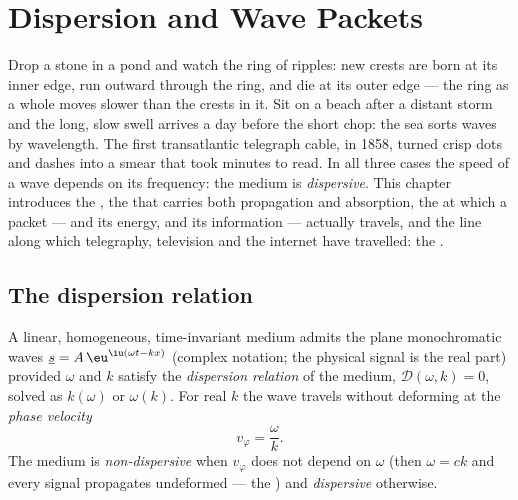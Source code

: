 \chapter{Dispersion and Wave Packets}\label{ch:b2:dispersion-wave-packets}

Drop a stone in a pond and watch the ring of ripples: new crests are
born at its inner edge, run outward through the ring, and die at its
outer edge --- the ring as a whole moves slower than the crests in it.
Sit on a beach after a distant storm and the long, slow swell arrives
a day before the short chop: the sea sorts waves by wavelength. The
first transatlantic telegraph cable, in 1858, turned crisp dots and
dashes into a smear that took minutes to read. In all three cases the
speed of a wave depends on its frequency: the medium is
\emph{dispersive}. This chapter introduces the , the
 that carries both propagation and absorption, the
 at which a packet --- and its energy, and its
information --- actually travels, and the line along which telegraphy,
television and the internet have travelled: the .

\section{The dispersion relation}

\begin{definition}\label{def:b2:dispersion-wave-packets:relation}
A linear, homogeneous, time-invariant medium admits the plane
monochromatic waves $\underline s = A\,\eu^{\iu(\omega t - kx)}$ (complex
notation; the physical signal is the real part) provided $\omega$ and $k$
satisfy the \emph{dispersion relation} of the medium, $\mathcal D(\omega, k)
= 0$, solved as $k(\omega)$ or $\omega(k)$. For real $k$ the wave travels
without deforming at the \emph{phase velocity}
\[
v_\varphi = \frac\omega k .
\]
The medium is \emph{non-dispersive} when $v_\varphi$ does not depend on
$\omega$ (then $\omega = ck$ and every signal propagates undeformed --- the
) and \emph{dispersive} otherwise.
\end{definition}

